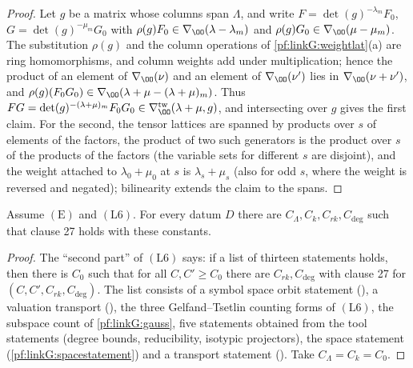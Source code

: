 \begin{proof}
Let $g$ be a matrix whose columns span $\Lambda$, and write $F=\det(g)^{-\lambda_m}F_0$, $G=\det(g)^{-\mu_m}G_0$ with
$\rho(g)F_0\in\nabla_\OO(\lambda-\lambda_m)$ and $\rho(g)G_0\in\nabla_\OO(\mu-\mu_m)$. The substitution $\rho(g)$ and the
column operations of \cref{pf:linkG:weightlat}(a) are ring homomorphisms, and column weights add under multiplication;
hence the product of an element of $\nabla_\OO(\nu)$ and an element of $\nabla_\OO(\nu')$ lies in $\nabla_\OO(\nu+\nu')$,
and $\rho(g)(F_0G_0)\in\nabla_\OO(\lambda+\mu-(\lambda+\mu)_m)$. Thus
$FG=\det(g)^{-(\lambda+\mu)_m}F_0G_0\in\nabla^{\mathrm{tw}}_\OO(\lambda+\mu,g)$, and intersecting over $g$ gives the first
claim. For the second, the tensor lattices are spanned by products over $s$ of elements of the factors, the product of two
such generators is the product over $s$ of the products of the factors (the variable sets for different $s$ are disjoint),
and the weight attached to $\lambda_0+\mu_0$ at $s$ is $\lambda_s+\mu_s$ (also for odd $s$, where the weight is reversed and
negated); bilinearity extends the claim to the spans.
\end{proof}

\begin{proposition}\label{pf:linkG:planecount}
Assume $(\mathrm E)$ and $(\mathrm L6)$. For every datum $D$ there are $C_\Lambda,C_k,C_{rk},C_{\deg}$ such that clause
27 holds with these constants.
\end{proposition}

\begin{proof}
The ``second part'' of $(\mathrm L6)$ says: if a list of thirteen statements holds, then there is
$C_0$ such that for all $C,C'\ge C_0$ there are $C_{rk},C_{\deg}$ with clause 27 for $(C,C',C_{rk},C_{\deg})$. The list
consists of a symbol space orbit statement
(), a valuation transport
(), the three Gelfand--Tsetlin counting forms of
$(\mathrm L6)$, the subspace count of \cref{pf:linkG:gauss}, five statements obtained from the tool statements (degree
bounds, reducibility, isotypic projectors), the space statement
(\cref{pf:linkG:spacestatement}) and a transport statement
(). Take $C_\Lambda=C_k=C_0$.
\end{proof}

